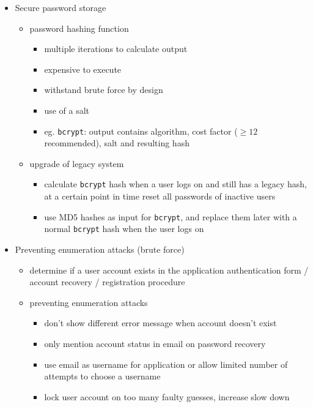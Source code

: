 \documentclass[12pt,titlepage,a4paper]{report}
\begin{document}
\begin{itemize}
				\item Secure password storage
				\begin{itemize}
					\item password hashing function
					\begin{itemize}
						\item multiple iterations to calculate output
						\item expensive to execute
						\item withstand brute force by design
						\item use of a salt
						\item eg. \texttt{bcrypt}: output contains algorithm, cost factor ($\geq 12$ recommended), salt and resulting hash
					\end{itemize}
					\item upgrade of legacy system
					\begin{itemize}
						\item calculate \texttt{bcrypt} hash when a user logs on and still has a legacy hash, at a certain point in time reset all passwords of inactive users
						\item use MD5 hashes as input for \texttt{bcrypt}, and replace them later with a normal \texttt{bcrypt} hash when the user logs on
					\end{itemize}
				\end{itemize}
			
				\item Preventing enumeration attacks (brute force)
				\begin{itemize}
					\item determine if a user account exists in the application
						\subitem authentication form / account recovery / registration procedure
						\item  preventing enumeration attacks
							\begin{itemize}
								\item don't show different error message when account doesn't exist
								\item only mention account status in email on password recovery
								\item use email as username for application or allow limited number of attempts to choose a username
								\item lock user account on too many faulty guesses, increase slow down
							\end{itemize}
				\end{itemize}
			

\end{itemize}
\end{document}

